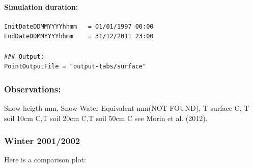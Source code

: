 \documentclass[
]{article}
\begin{document}
\hypertarget{simulation-duration}{%
\paragraph{Simulation duration:}\label{simulation-duration}}

\begin{verbatim}
InitDateDDMMYYYYhhmm   = 01/01/1997 00:00
EndDateDDMMYYYYhhmm    = 31/12/2011 23:00

### Output:
PointOutputFile = "output-tabs/surface"
\end{verbatim}

\hypertarget{observations}{%
\subsubsection{Observations:}\label{observations}}

Snow heigth mm, Snow Water Equivalent mm(NOT FOUND), T surface C, T soil
10cm C,T soil 20cm C,T soil 50cm C see Morin et al. (2012).

\hypertarget{winter-20012002}{%
\subsubsection{Winter 2001/2002}\label{winter-20012002}}

Here is a comparison plot:
\end{document}
